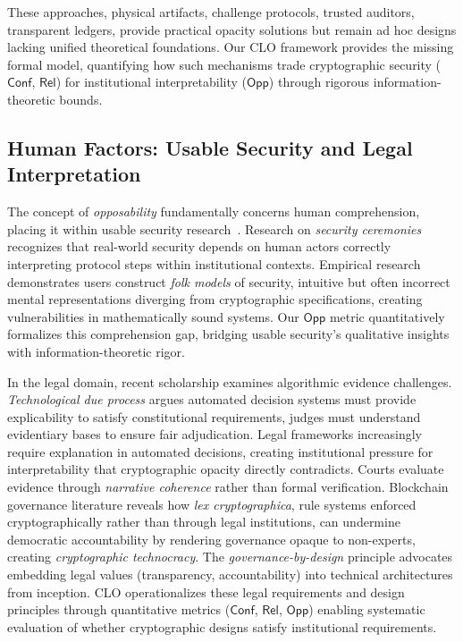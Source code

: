 \documentclass{ieeeaccess}
\begin{document}
These approaches, physical artifacts, challenge protocols, trusted auditors, transparent ledgers, provide practical opacity solutions but remain ad hoc designs lacking unified theoretical foundations. Our CLO framework provides the missing formal model, quantifying how such mechanisms trade cryptographic security ($\mathsf{Conf}$, $\mathsf{Rel}$) for institutional interpretability ($\mathsf{Opp}$) through rigorous information-theoretic bounds.

\subsection{Human Factors: Usable Security and Legal Interpretation}

The concept of \emph{opposability} fundamentally concerns human comprehension, placing it within usable security research~\cite{Cranor08,Herley09}. Research on \emph{security ceremonies} recognizes that real-world security depends on human actors correctly interpreting protocol steps within institutional contexts. Empirical research demonstrates users construct \emph{folk models} of security, intuitive but often incorrect mental representations diverging from cryptographic specifications, creating vulnerabilities in mathematically sound systems. Our $\mathsf{Opp}$ metric quantitatively formalizes this comprehension gap, bridging usable security's qualitative insights with information-theoretic rigor.

In the legal domain, recent scholarship examines algorithmic evidence challenges. \emph{Technological due process} argues automated decision systems must provide explicability to satisfy constitutional requirements, judges must understand evidentiary bases to ensure fair adjudication. Legal frameworks increasingly require explanation in automated decisions, creating institutional pressure for interpretability that cryptographic opacity directly contradicts. Courts evaluate evidence through \emph{narrative coherence} rather than formal verification. Blockchain governance literature reveals how \emph{lex cryptographica}, rule systems enforced cryptographically rather than through legal institutions, can undermine democratic accountability by rendering governance opaque to non-experts, creating \emph{cryptographic technocracy}. The \emph{governance-by-design} principle advocates embedding legal values (transparency, accountability) into technical architectures from inception. CLO operationalizes these legal requirements and design principles through quantitative metrics ($\mathsf{Conf}$, $\mathsf{Rel}$, $\mathsf{Opp}$) enabling systematic evaluation of whether cryptographic designs satisfy institutional requirements.
\end{document}

